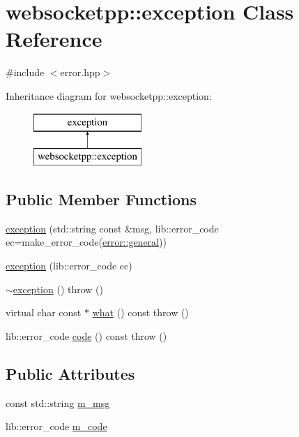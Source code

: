 \hypertarget{classwebsocketpp_1_1exception}{}\section{websocketpp\+:\+:exception Class Reference}
\label{classwebsocketpp_1_1exception}


{\ttfamily \#include $<$error.\+hpp$>$}

Inheritance diagram for websocketpp\+:\+:exception\+:\begin{figure}[H]
\begin{center}
\leavevmode
\includegraphics[height=2.000000cm]{classwebsocketpp_1_1exception}
\end{center}
\end{figure}
\subsection*{Public Member Functions}
\begin{DoxyCompactItemize}
\item 
\hyperlink{classwebsocketpp_1_1exception_af95696b245ec29c38666bf6ac00e95b2}{exception} (std\+::string const \&msg, lib\+::error\+\_\+code ec=make\+\_\+error\+\_\+code(\hyperlink{namespacewebsocketpp_1_1error_a0558d884e44e79146ad4947aea63f68da0cd3808919f43e5fbeee42fbcb808d66}{error\+::general}))
\item 
\hyperlink{classwebsocketpp_1_1exception_aa90a59ff911af87c912fde8ff4d44c92}{exception} (lib\+::error\+\_\+code ec)
\item 
\hyperlink{classwebsocketpp_1_1exception_aa61e782a64249f6518f78de4bb634327}{$\sim$exception} ()  throw ()
\item 
virtual char const $\ast$ \hyperlink{classwebsocketpp_1_1exception_ae453fe481851cbd3e9d0d88c77759d5b}{what} () const   throw ()
\item 
lib\+::error\+\_\+code \hyperlink{classwebsocketpp_1_1exception_a8a578dafec668cff956bc788f022dfc7}{code} () const   throw ()
\end{DoxyCompactItemize}
\subsection*{Public Attributes}
\begin{DoxyCompactItemize}
\item 
const std\+::string \hyperlink{classwebsocketpp_1_1exception_a6a739f94138be314aaac2ef3b5e5b467}{m\+\_\+msg}
\item 
lib\+::error\+\_\+code \hyperlink{classwebsocketpp_1_1exception_ab34949df4a66b0ac7c3f2928364c85c7}{m\+\_\+code}
\end{DoxyCompactItemize}


